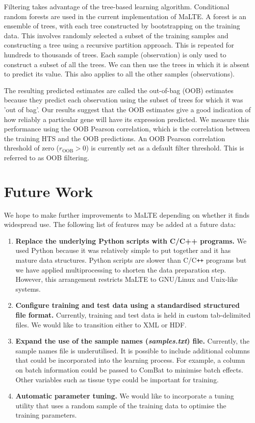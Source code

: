 \documentclass[a4paper,12pt]{article}
\begin{document}
Filtering takes advantage of the tree-based learning algorithm. Conditional random forests are used in the current implementation of \textsf{MaLTE}. A forest is an ensemble of trees, with each tree constructed by bootstrapping on the training data. This involves randomly selected a subset of the training samples and constructing a tree using a recursive partition approach. This is repeated for hundreds to thousands of trees. Each sample (observation) is only used to construct a subset of all the trees. We can then use the trees in which it is absent to predict its value. This also applies to all the other samples (observations).

The resulting predicted estimates are called the out-of-bag (OOB) estimates because they predict each observation using the subset of trees for which it was 'out of bag'. Our results suggest that the OOB estimates give a good indication of how reliably a particular gene will have its expression predicted. We measure this performance using the OOB Pearson correlation, which is the correlation between the training HTS and the OOB predictions. An OOB Pearson correlation threshold of zero ($r_{\mathrm{OOB}} > 0$) is currently set as a default filter threshold. This is referred to as OOB filtering.

\section{Future Work}
\label{future}
We hope to make further improvements to \textsf{MaLTE} depending on whether it finds widespread use. The following list of features may be added at a future data:
\begin{enumerate}
\item \textbf{Replace the underlying \textsf{Python} scripts with C/C++ programs.} We used \textsf{Python} because it was relatively simple to put together and it has mature data structures. \textsf{Python} scripts are slower than \textsf{C/C}\verb!++! programs but we have applied multiprocessing to shorten the data preparation step. However, this arrangement restricts \textsf{MaLTE} to GNU/Linux and Unix-like systems.
\item \textbf{Configure training and test data using a standardised structured file format.} Currently, training and test data is held in custom tab-delimited files. We would like to transition either to XML or HDF.
\item \textbf{Expand the use of the sample names (\textit{samples.txt}) file.} Currently, the sample names file is underutilised. It is possible to include additional columns that could be incorporated into the learning process. For example, a column on batch information could be passed to \textsf{ComBat} to minimise batch effects. Other variables such as tissue type could be important for training.
\item \textbf{Automatic parameter tuning.} We would like to incorporate a tuning utility that uses a random sample of the training data to optimise the training parameters.
\end{enumerate}
\end{document}
